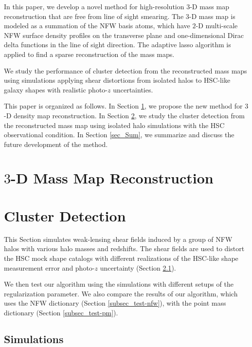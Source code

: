 \documentclass[twocolumn]{aastex63}
\begin{document}
In this paper, we develop a novel method for high-resolution $3$-D mass map
reconstruction that are free from line of sight smearing.  The $3$-D
mass map is modeled as a summation of the NFW \citep{halo-NFW1997ApJ} basis
atoms, which have $2$-D multi-scale NFW surface density profiles on the
transverse plane and one-dimensional Dirac delta functions in the line of sight
direction. The adaptive lasso algorithm \citep{AdaLASSO-Zou2006} is applied to
find a sparse reconstruction of the mass maps.

We study the performance of cluster detection from the reconstructed mass maps
using simulations applying shear distortions from isolated halos to HSC-like
galaxy shapes with realistic photo-$z$ uncertainties.


This paper is organized as follows.
In Section \ref{sec_Method}, we propose the new method for $3$-D density map
reconstruction.
In Section \ref{sec_Test}, we study the cluster detection from the
reconstructed mass map using isolated halo simulations with the HSC
observational condition.
In Section \ref{sec_Sum}, we summarize and discuss the future development of
the method.


\section{$3$-D Mass Map Reconstruction}
\label{sec_Method}



\section{Cluster Detection}
\label{sec_Test}

This Section simulates weak-lensing shear fields induced by a group of NFW
halos with various halo masses and redshifts. The shear fields are used to
distort the HSC mock shape catalogs with different realizations of the HSC-like
shape measurement error and photo-$z$ uncertainty (Section \ref{subsec_Sims}).

We then test our algorithm using the simulations with different setups of the
regularization parameter. We also compare the results of our algorithm, which
uses the NFW dictionary (Section \ref{subsec_test-nfw}), with the point mass
dictionary (Section \ref{subsec_test-pm}).

\subsection{Simulations}
\label{subsec_Sims}

\end{document}
